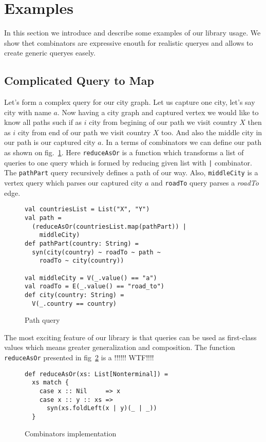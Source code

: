 \section{Examples}

In this section we introduce and describe some examples of our library usage.
We show thet combinators are expressive enouth for realistic queryes and allows to create generic queryes easely.

\subsection{Complicated Query to Map}

Let's form a complex query for our city graph. 
Let us capture one city, let's say city with name $a$. 
Now having a city graph and captured vertex we would like to know all paths such if as $i$ city from begining of our path we visit country $X$ then as $i$ city from end of our path we visit country $X$ too. 
And also the middle city in our path is our captured city $a$.
In a terms of combinators we can define our path as shown on fig.~\ref{fig:pathQuery}.
Here \lstinline{reduceAsOr} is a function which transforms a list of queries to one query which is formed by reducing given list with \lstinline{|} combinator.
The \lstinline{pathPart} query recursively defines a path of our way.
Also, \lstinline{middleCity} is a vertex query which parses our captured city $a$ and \lstinline{roadTo} query parses a \emph{roadTo} edge.

\begin{figure}[h]
\begin{lstlisting}
val countriesList = List("X", "Y")
val path = 
  (reduceAsOr(countriesList.map(pathPart)) | 
    middleCity)
def pathPart(country: String) =
  syn(city(country) ~ roadTo ~ path ~ 
    roadTo ~ city(country))

val middleCity = V(_.value() == "a")
val roadTo = E(_.value() == "road_to")
def city(country: String) =
  V(_.country == country)
\end{lstlisting}
\caption{Path query}
\label{fig:pathQuery}
\end{figure}


The most exciting feature of our library is that queries can be used as first-class values which means greater generalization and composition. 
The function \lstinline{reduceAsOr} presented in fig~\ref{fig:reduceAsOr} is a !!!!!! WTF!!!!

\begin{figure}[h]
\begin{lstlisting}
def reduceAsOr(xs: List[Nonterminal]) = 
  xs match {
    case x :: Nil     => x
    case x :: y :: xs => 
      syn(xs.foldLeft(x | y)(_ | _))
  }
\end{lstlisting}
\caption{Combinators implementation}
\label{fig:reduceAsOr}
\end{figure}

